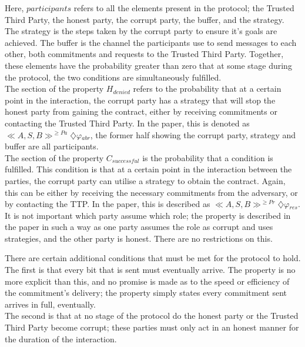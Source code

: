 \documentclass{l4proj}
\begin{document}
Here, $participants$ refers to all the elements present in the protocol; the Trusted Third Party, the honest party, the corrupt party, the buffer, and the strategy. The strategy is the steps taken by the corrupt party to ensure it's goals are achieved. The buffer is the channel the participants use to send messages to each other, both commitments and requests to the Trusted Third Party. Together, these elements have the probability greater than zero that at some stage during the protocol, the two conditions are simultaneously fulfilled.\\
The section of the property $H_{denied}$ refers to the probability that at a certain point in the interaction, the corrupt party has a strategy that will stop the honest party from gaining the contract, either by receiving commitments or contacting the Trusted Third Party. In the paper, this is denoted as  $\ll A, S, B \gg^{\ge Pa} \diamondsuit \varphi{_{abr}}$, the former half showing the corrupt party, strategy and buffer are all participants. \\
The section of the property $C_{successful}$ is the probability that a condition is fulfilled. This condition is that at a certain point in the interaction between the parties, the corrupt party can utilise a strategy to obtain the contract. Again, this can be either by receiving the necessary commitments from the adversary, or by contacting the TTP. In the paper, this is described as $\ll A, S, B \gg^{\ge Pr} \diamondsuit \varphi{_{res}}$. \\
It is not important which party assume which role; the property is described in the paper in such a way as one party assumes the role as corrupt and uses strategies, and the other party is honest. There are no restrictions on this.

There are certain additional conditions that must be met for the protocol to hold. The first is that every bit that is sent must eventually arrive. The property is no more explicit than this, and no promise is made as to the speed or efficiency of the commitment's delivery; the property simply states every commitment sent arrives in full, eventually.\\
The second is that at no stage of the protocol do the honest party or the Trusted Third Party become corrupt; these parties must only act in an honest manner for the duration of the interaction.
\end{document}
